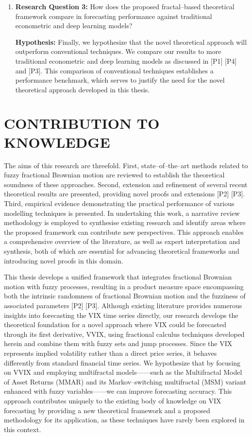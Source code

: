 \documentclass[12pt,a4paper]{report}
\numberwithin{equation}{section}
\begin{document}
\begin{enumerate}
\item \textbf{Research Question 3:} How does the proposed fractal--based theoretical framework compare in forecasting performance against traditional econometric and deep learning models?

\textbf{Hypothesis:} Finally, we hypothesize that the novel theoretical approach will outperform conventional techniques. We compare our results to more traditional econometric and deep learning models as discussed in [P1] [P4] and [P3]. This comparison of conventional techniques establishes a performance benchmark, which serves to justify the need for the novel theoretical approach developed in this thesis.

\end{enumerate}

\hypertarget{contribution--to--knowledge}{%
\section{\texorpdfstring{\textbf{CONTRIBUTION TO
KNOWLEDGE}}{CONTRIBUTION TO KNOWLEDGE}}\label{contribution--to--knowledge}}

The aims of this research are threefold. First,
state--of--the--art methods related to fuzzy fractional Brownian motion are reviewed to establish the theoretical soundness of these approaches. Second, 
extension and refinement of several recent theoretical results are presented, providing novel proofs and extensions [P2] [P3]. Third, empirical evidence demonstrating the practical performance of
various modelling techniques is presented. In undertaking this work, a
narrative review methodology is employed to synthesise existing research and
identify areas where the proposed framework can contribute new
perspectives. This approach enables a comprehensive overview of the
literature, as well as expert interpretation and synthesis, both of
which are essential for advancing theoretical frameworks and introducing
novel proofs in this domain.

This thesis develops a unified framework that integrates fractional
Brownian motion with fuzzy processes, resulting in a product measure
space encompassing both the intrinsic randomness of fractional Brownian
motion and the fuzziness of associated parameters [P2] [P3].
Although existing literature provides numerous insights into forecasting
the VIX time series directly, our research develops the theoretical
foundation for a novel approach where VIX could be forecasted through
its first derivative, VVIX, using fractional calculus techniques
developed herein and combine them with fuzzy sets and jump processes.
Since the VIX represents implied volatility rather than a direct price
series, it behaves differently from standard financial time series. We
hypothesize that by focusing on VVIX and employing multifractal
models------such as the Multifractal Model of Asset Returns (MMAR) and its
Markov--switching multifractal (MSM) variant enhanced with fuzzy
variables------we can improve forecasting accuracy. This approach
contributes uniquely to the existing body of knowledge on VIX
forecasting by providing a new theoretical framework and a proposed
methodology for its application, as these techniques have rarely been
explored in this context.
\end{document}

